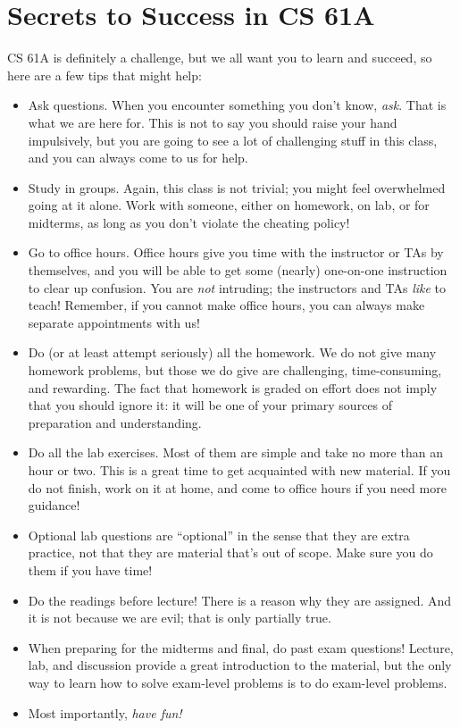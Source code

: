 \section*{Secrets to Success in CS 61A}
CS 61A is definitely a challenge, but we all want you to learn and
succeed, so here are a few tips that might help:

\begin{itemize}
\item Ask questions. When you encounter something you don't know, {\it
ask}. That is what we are here for. This is not to say you should raise your
hand impulsively, but you are going to see a lot of challenging stuff in this
class, and you can always come to us for help.
\item Study in groups. Again, this class is not trivial; you might feel
overwhelmed going at it alone. Work with someone, either on homework, on lab, or
for midterms, as long as you don't violate the cheating policy!
\item Go to office hours. Office hours give you time with the instructor or TAs
by themselves, and you will be able to get some (nearly) one-on-one instruction
to clear up confusion. You are {\it not} intruding; the instructors and TAs {\it
like} to teach!  Remember, if you cannot make office hours, you can always
make separate appointments with us!
\item Do (or at least attempt seriously) all the homework.  We do not give many
homework problems, but those we do give are challenging, time-consuming, and
rewarding. The fact that homework is graded on effort does not imply that you
should ignore it: it will be one of your primary sources of preparation and
understanding.
\item Do all the lab exercises. Most of them are simple and take no more than an
hour or two. This is a great time to get acquainted with new material. If you do
not finish, work on it at home, and come to office hours if you need more
guidance!
\item Optional lab questions are ``optional'' in the sense that they are extra
practice, not that they are material that's out of scope. Make sure you do them
if you have time!
\item Do the readings before lecture! There is a reason why they are
assigned. And it is not because we are evil; that is only partially true.
\item When preparing for the midterms and final, do past exam questions! Lecture,
lab, and discussion provide a great introduction to the material, but the only way
to learn how to solve exam-level problems is to do exam-level problems.
\item Most importantly, {\it have fun!}
\end{itemize}
